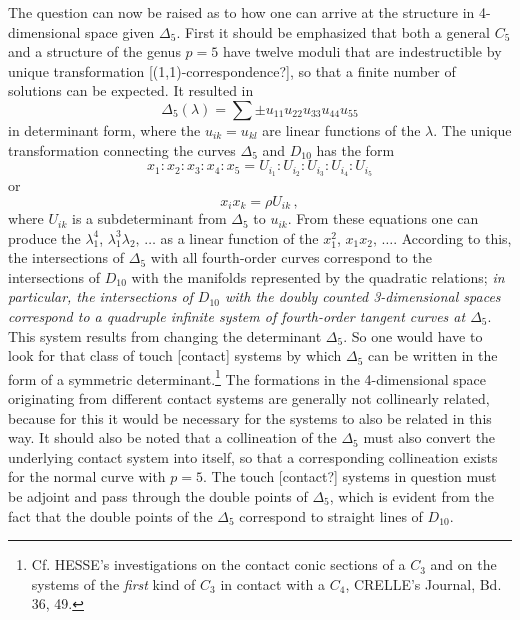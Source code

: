\documentclass[leqno]{article}
\begin{document}
 The question can now be raised as to how one can arrive at the structure in 4-dimensional space given $\Delta_5$. First it should be emphasized that both a general $C_5$ and a structure of the genus $p=5$ have twelve moduli that are indestructible by unique transformation [(1,1)-correspondence?], so that a finite number of solutions can be expected. It resulted in 
\[
\Delta_5(\lambda) = \sum \pm u_{11} u_{22} u_{33} u_{44} u_{55}
\] 
in determinant form, where the $u_{ik}=u_{kl}$ are linear functions of the $\lambda$. The unique transformation connecting the curves $\Delta_5$ and $D_{10}$ has the form 
\[
x_1 : x_2 : x_3 : x_4 : x_5 = U_{i_1} : U_{i_2} : U_{i_3} : U_{i_4} : U_{i_5}
\] 
or 
\[
x_i x_k = \rho U_{ik} \, , 
\] 
where $U_{ik}$ is a subdeterminant from $\Delta_5$ to $u_{ik} $. From these equations one can produce the $\lambda_1^4$, $\lambda_1^3 \lambda_2, \, \dots$ as a linear function of the $x_1^2$, $x_1 x_2, \, \dots$. According to this, the intersections of $\Delta_5$ with all fourth-order curves correspond to the intersections of $D_{10}$ with the manifolds represented by the quadratic relations; \textit{in particular, the intersections of $D_{10}$ with the doubly counted 3-dimensional spaces correspond to a quadruple infinite system of fourth-order tangent curves at $\Delta_5$}. This system results from changing the determinant $\Delta_5$. So one would have to look for that class of touch [contact] systems by which $\Delta_5$ can be written in the form of a symmetric determinant.\footnote{Cf. HESSE's investigations on the contact conic sections of a $C_3$ and on the systems of the \textit{first} kind of $C_3$ in contact with a $C_4$, CRELLE's Journal, Bd. 36, 49.} The formations in the 4-dimensional space originating from different contact systems are generally not collinearly related, because for this it would be necessary for the systems to also be related in this way. It should also be noted that a collineation of the $\Delta_5$ must also convert the underlying contact system into itself, so that a corresponding collineation exists for the normal curve with $p=5$. The touch [contact?] systems in question must be adjoint and pass through the double points of $\Delta_5$, which is evident from the fact that the double points of the $\Delta_5$ correspond to straight lines of $D_{10}$.
\end{document}
